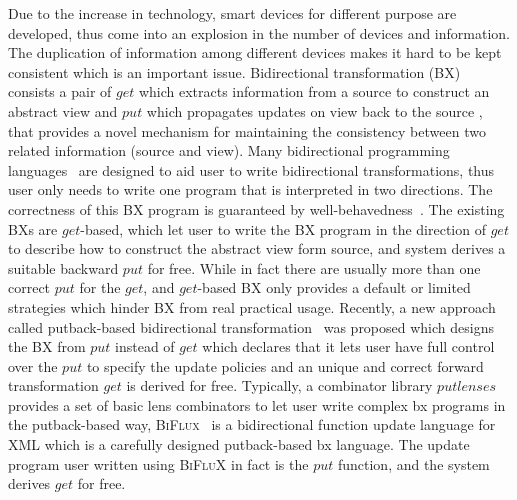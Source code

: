 \documentclass[fleqn]{llncs}
\begin{document}
Due to the increase in technology, smart devices for different purpose are developed, thus come into an explosion in the number of devices and information.
The duplication of information among different devices makes it hard to be kept consistent which is an important issue.
Bidirectional transformation (BX)~\cite{GRACE:09} consists a pair of 
$get$ which extracts information from a source to construct an abstract view
and $put$ which propagates updates on view back to the source
, that provides a novel mechanism for maintaining the consistency between two related information (source and view).
Many bidirectional programming languages~\cite{Lenses, Bohannon:06, HuMT08, MHNHT07, Hidaka:10, PachecoCunha:10, Barbosa:2010, Hofmann:2011, FoPP08, HoPW12} are designed
to aid user to write bidirectional transformations,
thus user only needs to write one program that is interpreted in two directions.
The correctness of this BX program is guaranteed by well-behavedness~\cite{Lenses}.
The existing BXs are $get$-based, which let user to write the BX program in the direction of $get$ to describe how to construct the abstract view form source, and system derives a suitable backward $put$ for free.
While in fact there are usually more than one correct $put$ for the $get$, and $get$-based BX only provides a default or limited strategies which hinder BX from real practical usage.
Recently, a new approach called putback-based bidirectional transformation~\cite{FiHP15} was proposed which designs the BX from $put$ instead of $get$
which declares that
it lets user have full control over the $put$ to specify the update policies
and an unique and correct forward transformation $get$ is derived for free.
Typically, a combinator library $putlenses$~\cite{PaHF14} provides a set of basic lens combinators to let user write complex bx programs in the putback-based way,
\textsc{BiFlux}~\cite{PaZH14} is a bidirectional function update language for XML which is a carefully designed putback-based bx language. 
The update program user written using \textsc{BiFluX} in fact is the $put$ function, and the system derives $get$ for free.
\end{document}
